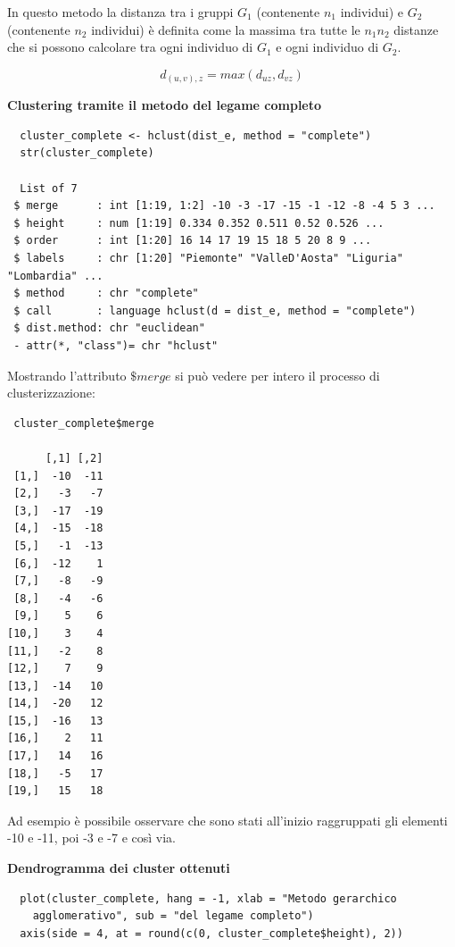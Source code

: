 In questo metodo la distanza tra i gruppi $G_1$ (contenente $n_1$ individui) e $G_2$ (contenente $n_2$ individui) è definita come la massima tra tutte le $n_1 n_2$ distanze che si possono calcolare tra ogni individuo di $G_1$ e ogni individuo di $G_2$.

\[d_{(u,v), z} = max(d_{uz}, d_{vz})\]

\noindent \textbf{Clustering tramite il metodo del legame completo}

\vspace{5mm}
\begin{lstlisting}
  cluster_complete <- hclust(dist_e, method = "complete")
  str(cluster_complete)

  List of 7
 $ merge      : int [1:19, 1:2] -10 -3 -17 -15 -1 -12 -8 -4 5 3 ...
 $ height     : num [1:19] 0.334 0.352 0.511 0.52 0.526 ...
 $ order      : int [1:20] 16 14 17 19 15 18 5 20 8 9 ...
 $ labels     : chr [1:20] "Piemonte" "ValleD'Aosta" "Liguria" "Lombardia" ...
 $ method     : chr "complete"
 $ call       : language hclust(d = dist_e, method = "complete")
 $ dist.method: chr "euclidean"
 - attr(*, "class")= chr "hclust"
\end{lstlisting}
\vspace{5mm}

Mostrando l'attributo $\$merge$ si può vedere per intero il processo di clusterizzazione:

\vspace{5mm}
\begin{lstlisting}
 cluster_complete$merge

      [,1] [,2]
 [1,]  -10  -11
 [2,]   -3   -7
 [3,]  -17  -19
 [4,]  -15  -18
 [5,]   -1  -13
 [6,]  -12    1
 [7,]   -8   -9
 [8,]   -4   -6
 [9,]    5    6
[10,]    3    4
[11,]   -2    8
[12,]    7    9
[13,]  -14   10
[14,]  -20   12
[15,]  -16   13
[16,]    2   11
[17,]   14   16
[18,]   -5   17
[19,]   15   18
\end{lstlisting}
\vspace{5mm}

Ad esempio è possibile osservare che sono stati all'inizio raggruppati gli elementi -10 e -11, poi -3 e -7 e così via.

\noindent \textbf{Dendrogramma dei cluster ottenuti}

\vspace{5mm}
\begin{lstlisting}
  plot(cluster_complete, hang = -1, xlab = "Metodo gerarchico
    agglomerativo", sub = "del legame completo")
  axis(side = 4, at = round(c(0, cluster_complete$height), 2))
\end{lstlisting}
\vspace{5mm}

